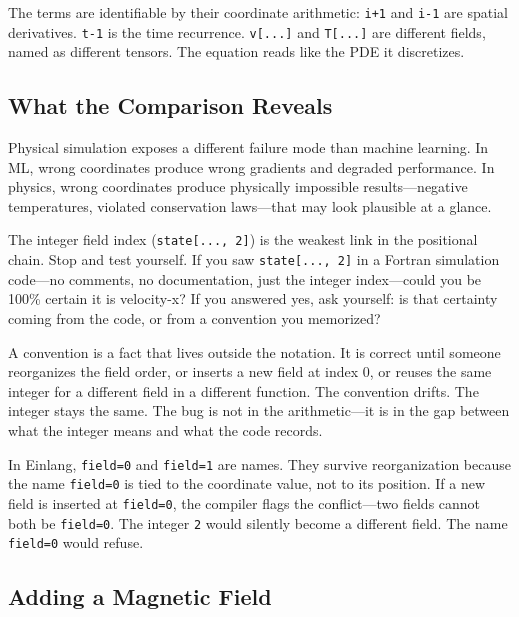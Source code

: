 \documentclass[11pt,titlepage]{article}
\begin{document}
The terms are identifiable by their coordinate arithmetic: \texttt{i+1}
and \texttt{i-1} are spatial derivatives. \texttt{t-1} is the time
recurrence. \texttt{v{[}...{]}} and \texttt{T{[}...{]}} are different
fields, named as different tensors. The equation reads like the PDE it
discretizes.

\vspace{2em}

\hypertarget{what-the-comparison-reveals}{%
\subsection{What the Comparison
Reveals}\label{what-the-comparison-reveals}}

Physical simulation exposes a different failure mode than machine
learning. In ML, wrong coordinates produce wrong gradients and degraded
performance. In physics, wrong coordinates produce physically impossible
results---negative temperatures, violated conservation laws---that may
look plausible at a glance.

The integer field index (\texttt{state{[}...,\ 2{]}}) is the weakest
link in the positional chain. Stop and test yourself. If you saw
\texttt{state{[}...,\ 2{]}} in a Fortran simulation code---no comments,
no documentation, just the integer index---could you be 100\% certain it
is velocity-x? If you answered yes, ask yourself: is that certainty
coming from the code, or from a convention you memorized?

A convention is a fact that lives outside the notation. It is correct
until someone reorganizes the field order, or inserts a new field at
index 0, or reuses the same integer for a different field in a different
function. The convention drifts. The integer stays the same. The bug is
not in the arithmetic---it is in the gap between what the integer means
and what the code records.

In Einlang, \texttt{field=0} and \texttt{field=1} are names. They
survive reorganization because the name \texttt{field=0} is tied to the
coordinate value, not to its position. If a new field is inserted at
\texttt{field=0}, the compiler flags the conflict---two fields cannot
both be \texttt{field=0}. The integer \texttt{2} would silently become a
different field. The name \texttt{field=0} would refuse.

\vspace{2em}

\hypertarget{adding-a-magnetic-field}{%
\subsection{Adding a Magnetic Field}\label{adding-a-magnetic-field}}
\end{document}

